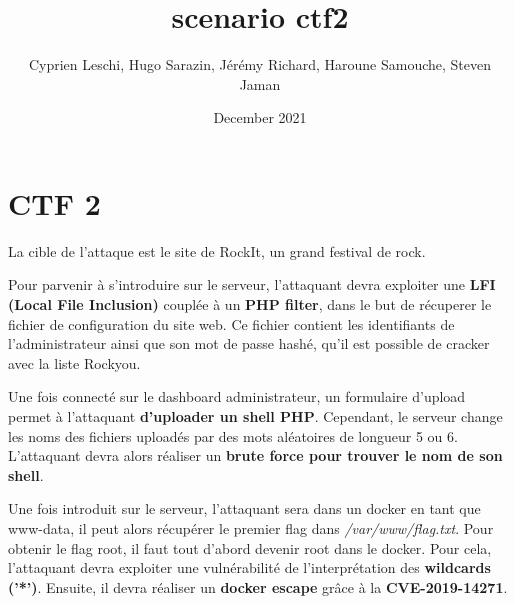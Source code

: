 \documentclass{article}
\title{scenario ctf2}
\author{Cyprien Leschi, Hugo Sarazin, Jérémy Richard, Haroune Samouche, Steven Jaman}
\date{December 2021}
\begin{document}
\maketitle

\section{CTF 2}

La cible de l'attaque est le site de RockIt, un grand festival de rock.

Pour parvenir à s'introduire sur le serveur, l'attaquant devra exploiter une \textbf{LFI (Local File Inclusion)} couplée à un \textbf{PHP filter}, dans le but de récuperer le fichier de configuration du site web. Ce fichier contient les identifiants de l'administrateur ainsi que son mot de passe hashé, qu'il est possible de cracker avec la liste Rockyou.

Une fois connecté sur le dashboard administrateur, un formulaire d'upload permet à l'attaquant \textbf{d'uploader un shell PHP}. Cependant, le serveur change les noms des fichiers uploadés par des mots aléatoires de longueur 5 ou 6. L'attaquant devra alors réaliser un \textbf{brute force pour trouver le nom de son shell}.

Une fois introduit sur le serveur, l'attaquant sera dans un docker en tant que www-data, il peut alors récupérer le premier flag dans \emph{/var/www/flag.txt}. Pour obtenir le flag root, il faut tout d’abord devenir root dans le docker. Pour cela, l’attaquant devra exploiter une vulnérabilité de l'interprétation des \textbf{wildcards ('*')}. Ensuite, il devra réaliser un \textbf{docker escape} grâce à la \textbf{CVE-2019-14271}.
\end{document}
